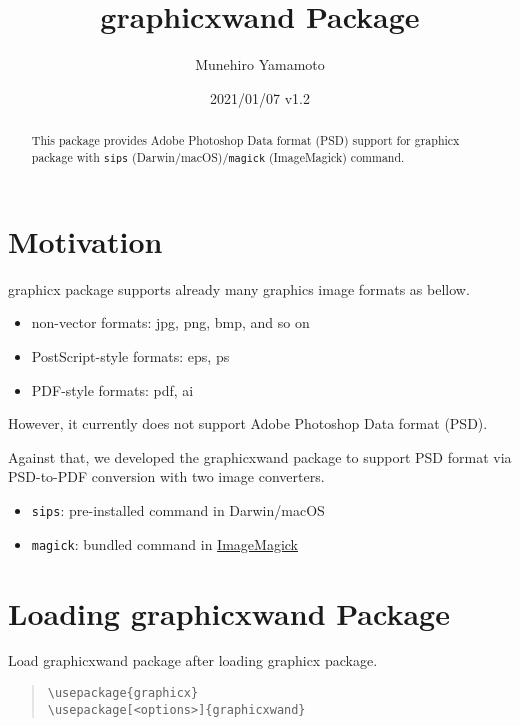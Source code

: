 \documentclass[luatex]{article}
\title{\textsf{graphicxwand} Package}
\author{Munehiro Yamamoto} %
\date{2021/01/07 v1.2} %
\begin{document}
\maketitle
\begin{abstract} %
This package provides Adobe Photoshop Data format (PSD) support
for \textsf{graphicx} package
with \texttt{sips} (Darwin/macOS)/\texttt{magick} (ImageMagick) command.
\end{abstract}

\section{Motivation} %
\textsf{graphicx} package supports already many graphics image formats as bellow.
\begin{itemize}
\item non-vector formats: jpg, png, bmp, and so on
\item PostScript-style formats: eps, ps
\item PDF-style formats: pdf, ai
\end{itemize}
However, it currently does not support Adobe Photoshop Data format (PSD).

Against that, we developed the \textsf{graphicxwand} package
to support PSD format via PSD-to-PDF conversion
with two image converters.
\begin{itemize}
\item \texttt{sips}:
pre-installed command in Darwin/macOS

\item \texttt{magick}:
bundled command in \href{https://www.imagemagick.org/}{ImageMagick}
\end{itemize}

\section{Loading \textsf{graphicxwand} Package}

Load \textsf{graphicxwand} package after loading \textsf{graphicx} package.

\begin{quote}
\begin{verbatim}
\usepackage{graphicx}
\usepackage[<options>]{graphicxwand}
\end{verbatim}
\end{quote}
\end{document}
